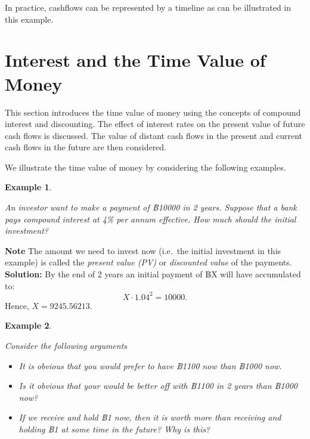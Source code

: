 \documentclass[landscape, 20pt]{extreport}
\theoremstyle{definition}
\theoremstyle{definition}
\newtheorem{example}{Example}[chapter]
\theoremstyle{definition}
\theoremstyle{definition}
\theoremstyle{remark}
\begin{document}
In practice, cashflows can be represented by a timeline as can be
illustrated in this example.

\hypertarget{interest-and-the-time-value-of-money}{%
\section{Interest and the Time Value of Money}\label{interest-and-the-time-value-of-money}}

This section introduces the time value of money using the concepts of
compound interest and discounting. The effect of interest rates on the
present value of future cash flows is discussed. The value of distant
cash flows in the present and current cash flows in the future are then
considered.

We illustrate the time value of money by considering the following
examples.

\newpage \begin{example}
\protect\hypertarget{exm:egpv}{}\label{exm:egpv}

\emph{An investor want to make a payment of ฿10000 in 2
years. Suppose that a bank pays compound interest at 4\% per annum
effective. How much should the initial investment?}

\end{example}

\textbf{Note} The amount we need to invest now (i.e.~the initial investment
in this example) is called the \emph{present value (PV)} or \emph{discounted
value} of the payments. \textbf{Solution:} By the end of 2 years an initial
payment of ฿X will have accumulated to: \[X  \cdot  1.04^2 = 10000.\]
Hence, \(X = 9245.56213\).

\newpage \begin{example}
\protect\hypertarget{exm:unlabeled-div-2}{}\label{exm:unlabeled-div-2}

\emph{Consider the following arguments}

\begin{itemize}
\item
  \emph{It is obvious that you would prefer to have ฿1100 now than ฿1000
  now.}
\item
  \emph{Is it obvious that your would be better off with ฿1100 in 2 years
  than ฿1000 now?}
\item
  \emph{If we receive and hold ฿1 now, then it is worth more than receiving
  and holding ฿1 at some time in the future? Why is this?}
\end{itemize}

\end{example}
\end{document}
